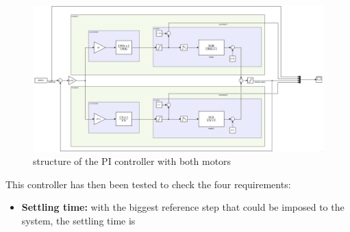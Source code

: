 \begin{figure}[H]
    \centering
    \includegraphics[width=\textwidth]{Pictures/simulink_whole_controller.png}
    \caption{structure of the PI controller with both motors}
    \label{fig:structure whole PI}
\end{figure}

This controller has then been tested to check the four requirements:

\begin{itemize}
    \item \textbf{Settling time:} with the biggest reference step that could be imposed to the
    system, the settling time is 
\end{itemize}

